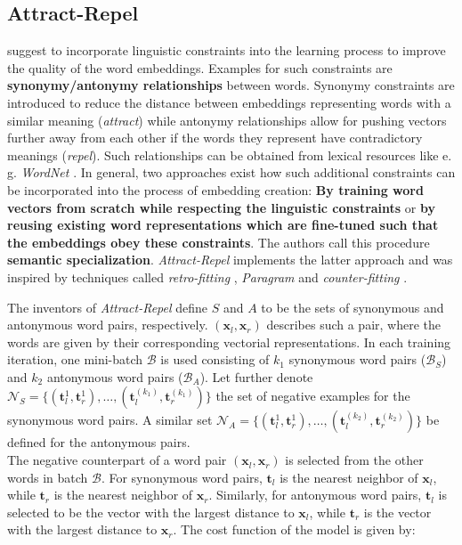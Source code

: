 \subsection{Attract-Repel}
\label{sec:attract_repel}

\citep{Mrksic.2017} suggest to incorporate linguistic constraints into the learning process to improve the quality of the word embeddings. Examples for such constraints are \textbf{synonymy/antonymy relationships} between words. Synonymy constraints are introduced to reduce the distance between embeddings representing words with a similar meaning (\textit{attract}) while antonymy relationships allow for pushing vectors further away from each other if the words they represent have contradictory meanings (\textit{repel}). Such relationships can be obtained from lexical resources like e.\,g. \textit{WordNet} \citep{Miller.1995}. In general, two approaches exist how such additional constraints can be incorporated into the process of embedding creation:  \textbf{By training word vectors from scratch while respecting the linguistic constraints} or  \textbf{by reusing existing word representations which are fine-tuned such that the embeddings obey these constraints}. The authors call this procedure \textbf{semantic specialization}. \textit{Attract-Repel} implements the latter approach and was inspired by techniques called \textit{retro-fitting} \citep{Faruqui.2015}, \textit{Paragram} \citep{Wieting.2015} and \textit{counter-fitting} \citep{Mrksic.2016}.

The inventors of \textit{Attract-Repel} define $S$ and $A$ to be the sets of synonymous and antonymous word pairs, respectively. $(\bm{x}_l, \bm{x}_r)$ describes such a pair, where the words are given by their corresponding vectorial representations. In each training iteration, one mini-batch $\mathcal{B}$ is used consisting of $k_1$ synonymous word pairs ($\mathcal{B}_S$) and $k_2$ antonymous word pairs ($\mathcal{B}_A$). Let further denote $\mathcal{N}_S = \{ (\bm{t}_l^1, \bm{t}_r^1), \dots, (\bm{t}_l^{(k_1)}, \bm{t}_r^{(k_1)}) \}$ the set of negative examples for the synonymous word pairs. A similar set $\mathcal{N}_A = \{ (\bm{t}_l^1, \bm{t}_r^1), \dots, (\bm{t}_l^{(k_2)}, \bm{t}_r^{(k_2)}) \}$ be defined for the antonymous pairs. \\
The negative counterpart of a word pair $(\bm{x}_l, \bm{x}_r)$ is selected from the other words in batch $\mathcal{B}$. For synonymous word pairs, $\bm{t}_l$ is the nearest neighbor of $\bm{x}_l$, while $\bm{t}_r$ is the nearest neighbor of $\bm{x}_r$. Similarly, for antonymous word pairs, $\bm{t}_l$ is selected to be the vector with the largest distance to $\bm{x}_l$, while $\bm{t}_r$ is the vector with the largest distance to $\bm{x}_r$. The cost function of the model is given by:

